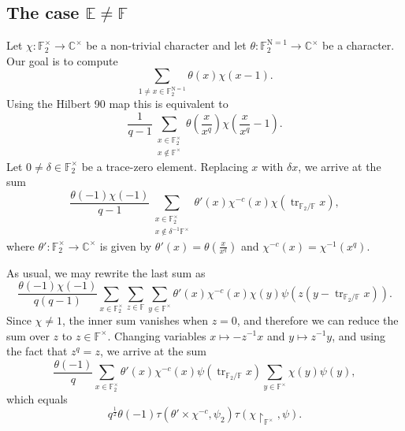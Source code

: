 \documentclass[12pt, reqno]{amsart}
\theoremstyle{definition}
\theoremstyle{definition}
\theoremstyle{definition}
\newcommand{\cComplex}{\mathbb{C}}
\newcommand{\multiplicativegroup}[1]{#1^{\times}}
\newcommand{\fieldCharacter}{\psi}
\newcommand{\minusInvolution}[1]{#1^{-c}}
\newcommand{\trace}{\operatorname{tr}}
\newcommand{\aFieldNorm}{\mathrm{N}}
\newcommand{\finiteField}{\mathbb{F}}
\newcommand{\quadraticExtension}{\mathbb{E}}
\newcommand{\finiteFieldExtension}[1]{\finiteField_{#1}}
\newcommand{\NormOneGroup}[1]{\finiteFieldExtension{#1}^{\aFieldNorm = 1}}
\newcommand{\GaussSumCharacter}[3]{\tau\left(#1 \times #2, #3\right)}
\begin{document}
\subsection{The case $\quadraticExtension \ne \finiteField$}
Let $\chi \colon \multiplicativegroup{\finiteFieldExtension{2}} \to \multiplicativegroup{\cComplex}$ be a non-trivial character and let $\theta \colon \NormOneGroup{2} \to \multiplicativegroup{\cComplex}$ be a character. Our goal is to compute $$\sum_{1 \ne x \in \NormOneGroup{2}} \theta\left(x\right) \chi\left(x-1\right).$$
Using the Hilbert 90 map this is equivalent to
$$\frac{1}{q-1} \sum_{\substack{x \in \multiplicativegroup{\finiteFieldExtension{2}}\\
x \notin \multiplicativegroup{\finiteField}}} \theta\left(\frac{x}{x^q}\right) \chi\left(\frac{x}{x^q}-1\right).$$
Let $0 \ne \delta \in \multiplicativegroup{\finiteFieldExtension{2}}$ be a trace-zero element. Replacing $x$ with $\delta x$, we arrive at the sum
$$\frac{\theta\left(-1\right) \chi\left(-1\right)}{q-1} \sum_{\substack{x \in \multiplicativegroup{\finiteFieldExtension{2}}\\
		x \notin \delta^{-1} \multiplicativegroup{\finiteField}}} \theta'\left(x\right) \minusInvolution{\chi}\left(x\right) \chi\left(\trace_{\finiteFieldExtension{2} \slash \finiteField} x\right),$$
	where $\theta' \colon \multiplicativegroup{\finiteFieldExtension{2}} \to \multiplicativegroup{\cComplex}$ is given by $\theta'\left(x\right) = \theta\left(\frac{x}{x^q}\right)$ and $\minusInvolution{\chi}\left(x\right) = \chi^{-1}\left(x^{q}\right)$.
	
	As usual, we may rewrite the last sum as
	$$\frac{\theta\left(-1\right) \chi\left(-1\right)}{q\left(q-1\right)} \sum_{x \in \multiplicativegroup{\finiteFieldExtension{2}}}\sum_{z \in \finiteField} \sum_{y \in \multiplicativegroup{\finiteField}}  \theta'\left(x\right) \minusInvolution{\chi}\left(x\right) \chi\left(y\right) \fieldCharacter\left(z\left(y - \trace_{\finiteFieldExtension{2} \slash \finiteField} x\right)\right).$$
	Since $\chi \ne 1$, the inner sum vanishes when $z = 0$, and therefore we can reduce the sum over $z$ to $z \in \multiplicativegroup{\finiteField}$. Changing variables $x \mapsto -z^{-1} x$ and $y \mapsto z^{-1} y$, and using the fact that $z^q = z$, we arrive at the sum
	$$\frac{\theta\left(-1\right)}{q} \sum_{x \in \multiplicativegroup{\finiteFieldExtension{2}}}\theta'\left(x\right)  \minusInvolution{\chi}\left(x\right) \fieldCharacter\left(\trace_{\finiteFieldExtension{2} \slash \finiteField} x\right) \sum_{y \in \multiplicativegroup{\finiteField}}   \chi\left(y\right) \fieldCharacter\left(y\right),$$
	which equals
	$$q^{\frac{1}{2}} \theta\left(-1\right) \GaussSumCharacter{\theta'}{\minusInvolution{\chi}}{\fieldCharacter_2} \tau\left(\chi \restriction_{\multiplicativegroup{\finiteField}}, \fieldCharacter\right).$$



\end{document}
